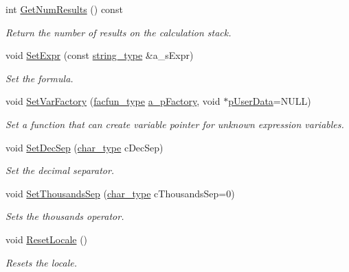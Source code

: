 \begin{DoxyCompactItemize}
\item 
int \hyperlink{classmu_1_1_parser_base_abcb1a6813b474d936b37dfef3e041e9d}{Get\+Num\+Results} () const 
\begin{DoxyCompactList}\small\item\em Return the number of results on the calculation stack. \end{DoxyCompactList}\item 
void \hyperlink{classmu_1_1_parser_base_aed9d02dd04f8e163102f9a8e082c4b26}{Set\+Expr} (const \hyperlink{namespacemu_ae9f8b44d9a97dd397180891e8390c3e9}{string\+\_\+type} \&a\+\_\+s\+Expr)
\begin{DoxyCompactList}\small\item\em Set the formula. \end{DoxyCompactList}\item 
void \hyperlink{classmu_1_1_parser_base_a713d8ddf5371c346942d22fdac5adda7}{Set\+Var\+Factory} (\hyperlink{namespacemu_a97af5f5c39391d262dda72084788b83e}{facfun\+\_\+type} \hyperlink{mu_parser_d_l_l_8h_af7bdd6658661ca9fa9e157a21f70d550}{a\+\_\+p\+Factory}, void $\ast$\hyperlink{mu_parser_d_l_l_8h_af2fe0b3322818bbb3e6f8b0457f1b802}{p\+User\+Data}=N\+U\+LL)
\begin{DoxyCompactList}\small\item\em Set a function that can create variable pointer for unknown expression variables. \end{DoxyCompactList}\item 
void \hyperlink{classmu_1_1_parser_base_a1699841ae7a78b23f521f937f09fae21}{Set\+Dec\+Sep} (\hyperlink{namespacemu_a81cc89a81a8872430ab1799b5848c5ca}{char\+\_\+type} c\+Dec\+Sep)
\begin{DoxyCompactList}\small\item\em Set the decimal separator. \end{DoxyCompactList}\item 
void \hyperlink{classmu_1_1_parser_base_ab539db832b9af0e5940a0481201077e9}{Set\+Thousands\+Sep} (\hyperlink{namespacemu_a81cc89a81a8872430ab1799b5848c5ca}{char\+\_\+type} c\+Thousands\+Sep=0)
\begin{DoxyCompactList}\small\item\em Sets the thousands operator. \end{DoxyCompactList}\item 
void \hyperlink{classmu_1_1_parser_base_a389a2502aa52212975f4a959fad59a47}{Reset\+Locale} ()
\begin{DoxyCompactList}\small\item\em Resets the locale. \end{DoxyCompactList}\item 

\end{DoxyCompactItemize}
